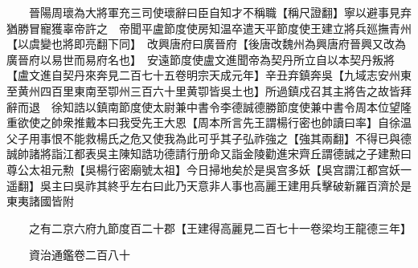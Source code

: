 　　晉陽周瓌為大將軍充三司使瓌辭曰臣自知才不稱職【稱尺證翻】寧以避事見弃猶勝冒寵獲辜帝許之　帝聞平盧節度使房知温卒遣天平節度使王建立將兵廵撫青州【以虞變也將即亮翻下同】　改興唐府曰廣晉府【後唐改魏州為興唐府晉興又改為廣晉府以易世而易府名也】　安遠節度使盧文進聞帝為契丹所立自以本契丹叛將【盧文進自契丹來奔見二百七十五卷明宗天成元年】辛丑弃鎮奔吳【九域志安州東至黄州四百里東南至卾州三百六十里黄卾皆吳土也】所過鎮戍召其主將告之故皆拜辭而退　徐知誥以鎮南節度使太尉兼中書令李德誠德勝節度使兼中書令周本位望隆重欲使之帥衆推戴本曰我受先王大恩【周本所言先王謂楊行密也帥讀曰率】自徐温父子用事恨不能救楊氏之危又使我為此可乎其子弘祚強之【強其兩翻】不得已與德誠帥諸將詣江都表吳主陳知誥功德請行册命又詣金陵勸進宋齊丘謂德誠之子建勲曰尊公太祖元勲【吳楊行密廟號太祖】今日掃地矣於是吳宫多妖【吳宫謂江都宫妖一遥翻】吳主曰吳祚其終乎左右曰此乃天意非人事也高麗王建用兵擊破新羅百濟於是東夷諸國皆附

　　之有二京六府九節度百二十郡【王建得高麗見二百七十一卷梁均王龍德三年】

　　資治通鑑卷二百八十  
    


 


 



 

 
  







 


　　
　　
　
　
　


　　

　















	
	









































